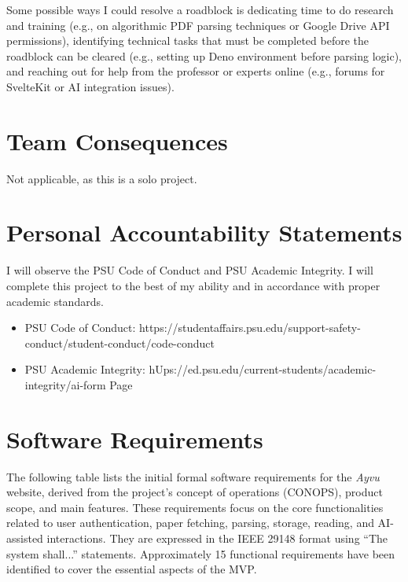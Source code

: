 \documentclass[12pt]{article}
\begin{document}
Some possible ways I could resolve a roadblock is dedicating time to do research and training (e.g., on algorithmic PDF parsing techniques or Google Drive API permissions), identifying technical tasks that must be completed before the roadblock can be cleared (e.g., setting up Deno environment before parsing logic), and reaching out for help from the professor or experts online (e.g., forums for SvelteKit or AI integration issues).

\section{Team Consequences}
Not applicable, as this is a solo project.

\section{Personal Accountability Statements}
I will observe the PSU Code of Conduct and PSU Academic Integrity. I will complete this project to the best of my ability and in accordance with proper academic standards.
\begin{itemize}
  \item PSU Code of Conduct: https://studentaffairs.psu.edu/support-safety-conduct/student-conduct/code-conduct
  \item PSU Academic Integrity: hUps://ed.psu.edu/current-students/academic-integrity/ai-form Page
\end{itemize}

\section{Software Requirements}

The following table lists the initial formal software requirements for the \textit{Ayvu} website, derived from the project's concept of operations (CONOPS), product scope, and main features. These requirements focus on the core functionalities related to user authentication, paper fetching, parsing, storage, reading, and AI-assisted interactions. They are expressed in the IEEE 29148 format using ``The system shall...'' statements. Approximately 15 functional requirements have been identified to cover the essential aspects of the MVP.
\end{document}

